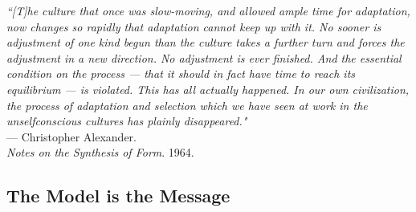 \begin{flushright}
\small{
\textit{``[T]he culture that once was slow-moving, and allowed ample time for adaptation, now changes so rapidly that adaptation cannot keep up with it. No sooner is adjustment of one kind begun than the culture takes a further turn and forces the adjustment in a new direction. No adjustment is ever finished. And the essential condition on the process --- that it should in fact have time to reach its equilibrium --- is violated. This has all actually happened. In our own civilization, the process of adaptation and selection which we have seen at work in the unselfconscious cultures has plainly disappeared."}}\\ --- Christopher Alexander. \\ \textit{Notes on the Synthesis of Form}. 1964.
\end{flushright}





\clearpage

\subsection{The Model is the Message}

